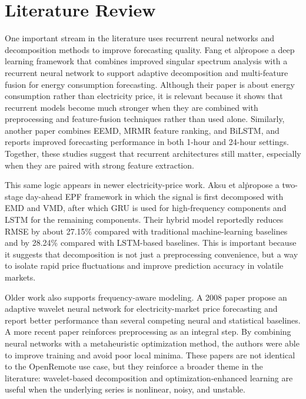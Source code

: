 \section{Literature Review}

One important stream in the literature uses recurrent neural networks and decomposition methods to improve forecasting quality. Fang et al\. propose a deep learning framework that combines improved singular spectrum analysis with a recurrent neural network to support adaptive decomposition and multi-feature fusion for energy consumption forecasting\cite{Fang2023}. Although their paper is about energy consumption rather than electricity price, it is relevant because it shows that recurrent models become much stronger when they are combined with preprocessing and feature-fusion techniques rather than used alone. Similarly, another paper combines EEMD, MRMR feature ranking, and BiLSTM, and reports improved forecasting performance in both 1-hour and 24-hour settings\cite{Shao2021}. Together, these studies suggest that recurrent architectures still matter, especially when they are paired with strong feature extraction.

This same logic appears in newer electricity-price work. Aksu et al\. propose a two-stage day-ahead EPF framework in which the signal is first decomposed with EMD and VMD, after which GRU is used for high-frequency components and LSTM for the remaining components\cite{Aksu2026}. Their hybrid model reportedly reduces RMSE by about 27.15\% compared with traditional machine-learning baselines and by 28.24\% compared with LSTM-based baselines. This is important because it suggests that decomposition is not just a preprocessing convenience, but a way to isolate rapid price fluctuations and improve prediction accuracy in volatile markets.

Older work also supports frequency-aware modeling. A 2008 paper propose an adaptive wavelet neural network for electricity-market price forecasting and report better performance than several competing neural and statistical baselines\cite{4494757}. A more recent paper reinforces preprocessing as an integral step\cite{Abedinia2017}. By combining neural networks with a metaheuristic optimization method, the authors were able to improve training and avoid poor local minima. These papers are not identical to the OpenRemote use case, but they reinforce a broader theme in the literature: wavelet-based decomposition and optimization-enhanced learning are useful when the underlying series is nonlinear, noisy, and unstable.

